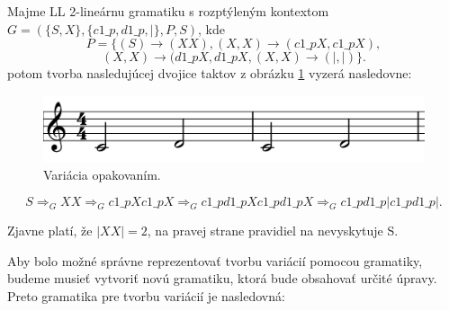 \begin{example}
Majme LL 2-lineárnu gramatiku s rozptýleným kontextom \\ $G = (\{S,X\},\{c1\_p, d1\_p, |\}, P, S)$, kde $$P = \{(S) \rightarrow (XX), (X,X) \rightarrow (c1\_pX, c1\_pX), $$
$$ (X,X) \rightarrow (d1\_pX, d1\_pX, (X,X) \rightarrow (|, |)\}.$$ potom tvorba nasledujúcej dvojice taktov z obrázku \ref{fig:Priklad1} vyzerá nasledovne:
\begin{figure}[H]
    \centering
    \includegraphics[scale=0.4]{thesis/obrazky-figures/Priklad1.png}
    \caption{Variácia opakovaním.}
    \label{fig:Priklad1}
\end{figure}
$$S \Rightarrow_G XX \Rightarrow_G c1\_pXc1\_pX \Rightarrow_G c1\_pd1\_pXc1\_pd1\_pX \Rightarrow_G c1\_pd1\_p|c1\_pd1\_p|.$$

Zjavne platí, že $|XX| = 2$, na pravej strane pravidiel na nevyskytuje S.
\end{example}

Aby bolo možné správne reprezentovať tvorbu variácií pomocou gramatiky, budeme musieť vytvoriť novú gramatiku, ktorá bude obsahovať určité úpravy. Preto gramatika pre tvorbu variácií je nasledovná:

